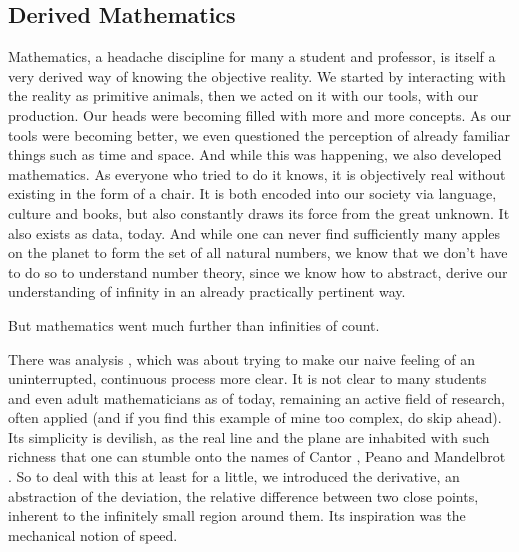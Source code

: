 \documentclass{article}
\begin{document}
\subsection*{Derived Mathematics}

Mathematics, a headache discipline for many a student and professor, is itself a very derived way of knowing the objective reality. We started by interacting with the reality as primitive animals, then we acted on it with our tools, with our production. Our heads were becoming filled with more and more concepts. As our tools were becoming better, we even questioned the perception of already familiar things such as time and space. And while this was happening, we also developed mathematics. As everyone who tried to do it knows, it is objectively real without existing in the form of a chair. It is both encoded into our society via language, culture and books, but also constantly draws its force from the great unknown. It also exists as data, today. And while one can never find sufficiently many apples on the planet to form the set of all natural numbers, we know that we don’t have to do so to understand number theory, since we know how to abstract, derive our understanding of infinity in an already practically pertinent way.

But mathematics went much further than infinities of count.

There was analysis \cite{ANALYSIS}, which was about trying to make our naive feeling of an uninterrupted, continuous process more clear. It is not clear to many students and even adult mathematicians as of today, remaining an active field of research, often applied (and if you find this example of mine too complex, do skip ahead). Its simplicity is devilish, as the real line and the plane are inhabited with such richness that one can stumble onto the names of Cantor \cite{CANTOR}, Peano \cite{PEANO} and Mandelbrot
\cite{MANDELBROT}. So to deal with this at least for a little, we introduced the derivative, an abstraction of the deviation, the relative difference between two close points, inherent to the infinitely small region around them. Its inspiration was the mechanical notion of speed.
\end{document}
